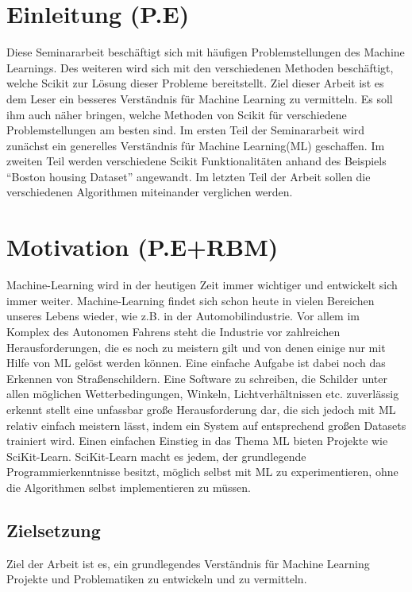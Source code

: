 \chapter{Einleitung (P.E)}
\label{chap:einleitung}
Diese Seminararbeit beschäftigt sich mit häufigen Problemstellungen des Machine Learnings. Des weiteren wird sich mit den verschiedenen Methoden beschäftigt, welche Scikit zur Lösung dieser Probleme bereitstellt. Ziel dieser Arbeit ist es dem Leser ein besseres Verständnis für Machine Learning zu vermitteln. Es soll ihm auch näher bringen, welche Methoden von Scikit für verschiedene Problemstellungen am besten sind. Im ersten Teil der Seminararbeit wird zunächst ein generelles Verständnis für Machine Learning(ML) geschaffen. Im zweiten Teil werden verschiedene Scikit Funktionalitäten anhand des Beispiels “Boston housing Dataset” angewandt. Im letzten Teil der Arbeit sollen die verschiedenen Algorithmen miteinander verglichen werden.

\chapter{Motivation (P.E+RBM)}
\label{sec:motivation}
Machine-Learning wird in der heutigen Zeit immer wichtiger und entwickelt sich immer weiter.\cite{MB} Machine-Learning findet sich schon heute in vielen Bereichen unseres Lebens wieder, wie z.B. in der Automobilindustrie\cite{DAIM}. Vor allem im Komplex des Autonomen Fahrens steht die Industrie vor zahlreichen Herausforderungen, die es noch zu meistern gilt und von denen einige nur mit Hilfe von ML gelöst werden können. Eine einfache Aufgabe ist dabei noch das Erkennen von Straßenschildern. Eine Software zu schreiben, die Schilder unter allen möglichen Wetterbedingungen, Winkeln, Lichtverhältnissen etc. zuverlässig erkennt stellt eine unfassbar große Herausforderung dar, die sich jedoch mit ML relativ einfach meistern lässt, indem ein System auf entsprechend großen Datasets trainiert wird. 
Einen einfachen Einstieg in das Thema ML bieten Projekte wie SciKit-Learn. SciKit-Learn macht es jedem, der grundlegende Programmierkenntnisse besitzt, möglich selbst mit ML zu experimentieren, ohne die Algorithmen selbst implementieren zu müssen.



\section{Zielsetzung}
\label{sec:zielsetzung}
Ziel der Arbeit ist es, ein grundlegendes Verständnis für Machine Learning Projekte und Problematiken zu entwickeln und zu vermitteln.

